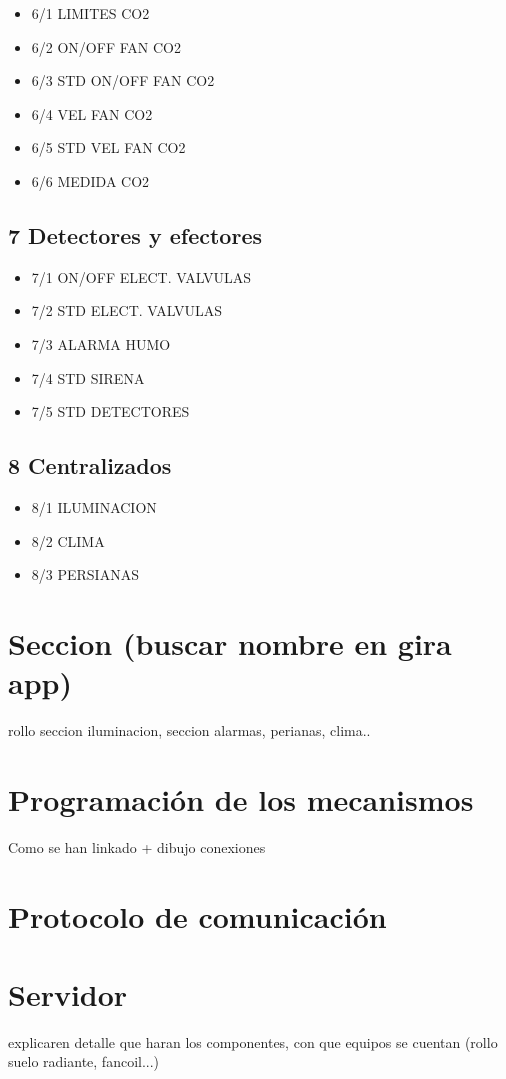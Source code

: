 \begin{itemize}
\item{6/1 LIMITES CO2}
\item{6/2 ON/OFF FAN CO2}
\item{6/3 STD ON/OFF FAN CO2}
\item{6/4 VEL FAN CO2}
\item{6/5 STD VEL FAN CO2}
\item{6/6 MEDIDA CO2}
\end{itemize} 

\subsection{7 Detectores y efectores}

\begin{itemize}
\item{7/1 ON/OFF ELECT. VALVULAS}
\item{7/2 STD ELECT. VALVULAS}
\item{7/3 ALARMA HUMO}
\item{7/4 STD SIRENA}
\item{7/5 STD DETECTORES}
\end{itemize} 

\subsection{8 Centralizados}

\begin{itemize}
\item{8/1 ILUMINACION}
\item{8/2 CLIMA}
\item{8/3 PERSIANAS}
\end{itemize} 

\section{Seccion (buscar nombre en gira app)}

rollo seccion iluminacion, seccion alarmas, perianas, clima..

\section{Programación de los mecanismos}

Como se han linkado + dibujo conexiones

\section{Protocolo de comunicación}




\section{Servidor}

explicaren detalle que haran los componentes, con que equipos se cuentan (rollo suelo radiante, fancoil...)